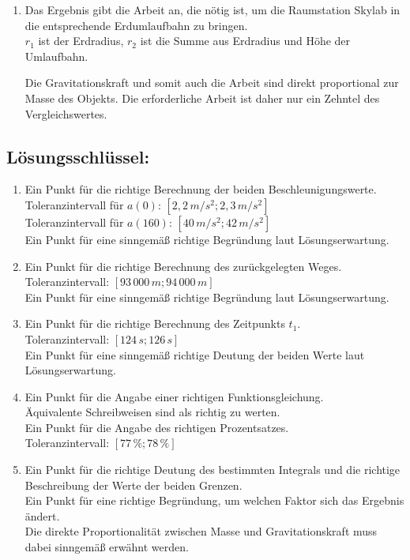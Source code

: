 \begin{langesbeispiel}
{\begin{enumerate}
\item Das Ergebnis gibt die Arbeit an, die nötig ist, um die Raumstation Skylab in die entsprechende Erdumlaufbahn zu bringen.\\
$r_1$ ist der Erdradius, $r_2$ ist die Summe aus Erdradius und Höhe der Umlaufbahn.

Die Gravitationskraft und somit auch die Arbeit sind direkt proportional zur Masse des Objekts. Die erforderliche Arbeit ist daher nur ein Zehntel des Vergleichswertes.
			\end{enumerate}
			
			\subsection{Lösungsschlüssel:}
\begin{enumerate}
\item Ein Punkt für die richtige Berechnung der beiden Beschleunigungswerte.\\
Toleranzintervall für $a(0):\,[2,2\,m/s^2; 2,3\,m/s^2]$\\
Toleranzintervall für $a(160):\,[40\,m/s^2; 42\,m/s^2]$\\
Ein Punkt für eine sinngemäß richtige Begründung laut Lösungserwartung.

\item Ein Punkt für die richtige Berechnung des zurückgelegten Weges.\\
Toleranzintervall: $[93\,000\,m; 94\,000\,m]$\\
Ein Punkt für eine sinngemäß richtige Begründung laut Lösungserwartung.

\item Ein Punkt für die richtige Berechnung des Zeitpunkts $t_1$.\\
Toleranzintervall: $[124\,s; 126\,s]$\\
Ein Punkt für eine sinngemäß richtige Deutung der beiden Werte laut Lösungserwartung.

\item Ein Punkt für die Angabe einer richtigen Funktionsgleichung.\\
Äquivalente Schreibweisen sind als richtig zu werten.\\
Ein Punkt für die Angabe des richtigen Prozentsatzes.\\
Toleranzintervall: $[77\,\%; 78\,\%]$

\item Ein Punkt für die richtige Deutung des bestimmten Integrals und die richtige Beschreibung
der Werte der beiden Grenzen.\\
Ein Punkt für eine richtige Begründung, um welchen Faktor sich das Ergebnis ändert.\\
Die direkte Proportionalität zwischen Masse und Gravitationskraft muss dabei sinngemäß
erwähnt werden.
\end{enumerate}}
		\end{langesbeispiel}